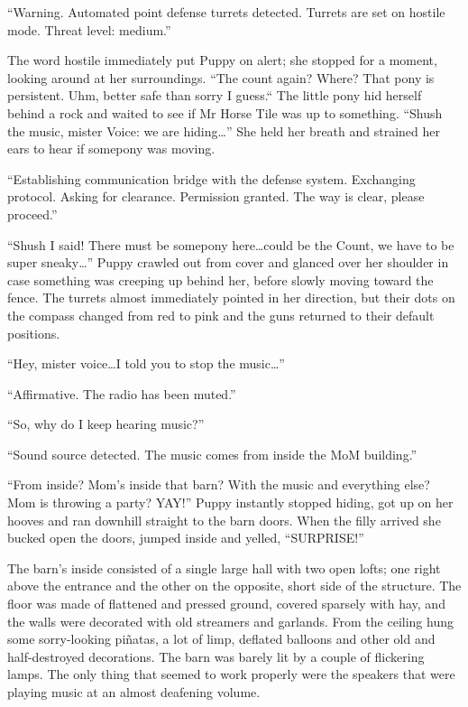 ``{\mt Warning. Automated point defense turrets detected. Turrets are set on hostile mode. Threat level: medium.}''

The word hostile immediately put Puppy on alert; she stopped for a moment, looking around at her surroundings. ``The count again? Where? That pony is persistent. Uhm, better safe than sorry I guess.`` The little pony hid herself behind a rock and waited to see if Mr Horse Tile was up to something. ``Shush the music, mister Voice: we are hiding\dots'' She held her breath and strained her ears to hear if somepony was moving.

``{\mt Establishing communication bridge with the defense system. Exchanging protocol. Asking for clearance. Permission granted. The way is clear, please proceed.}''

``Shush I said! There must be somepony here\dots could be the Count, we have to be super sneaky\dots'' Puppy crawled out from cover and glanced over her shoulder in case something was creeping up behind her, before slowly moving toward the fence. The turrets almost immediately pointed in her direction, but their dots on the compass changed from red to pink and the guns returned to their default positions.

``Hey, mister voice\dots I told you to stop the music\dots''

``{\mt Affirmative. The radio has been muted.}''

``So, why do I keep hearing music?''

``Sound source detected. The music comes from inside the MoM building.''

``From inside? Mom's inside that barn? With the music and everything else? Mom is throwing a party? YAY!'' Puppy instantly stopped hiding, got up on her hooves and ran downhill straight to the barn doors. When the filly arrived she bucked open the doors, jumped inside and yelled, ``SURPRISE!''

The barn's inside consisted of a single large hall with two open lofts; one right above the entrance and the other on the opposite, short side of the structure. The floor was made of flattened and pressed ground, covered sparsely with hay, and the walls were decorated with old streamers and garlands. From the ceiling hung some sorry-looking piñatas, a lot of limp, deflated balloons and other old and half-destroyed decorations. The barn was barely lit by a couple of flickering lamps. The only thing that seemed to work properly were the speakers that were playing music at an almost deafening volume.

